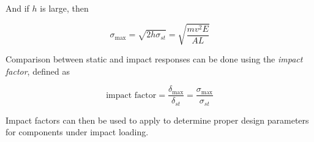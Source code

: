 \documentclass[
10pt,
a4paper,
openany,
svgnames,
]{book} %
\begin{document}
And if $h$ is large, then

\begin{equation}
  \sigma_{\max} = \sqrt{ 2h \sigma_{st} } = \sqrt{ \frac{mv^2 E}{AL} }
\end{equation}

Comparison between static and impact responses can be done using the \emph{impact factor}, defined as

\begin{equation}
  \text{impact factor} = \frac{\delta_{\max}}{\delta_{st}} = \frac{\sigma_{\max}}{\sigma_{st}}
\end{equation}

Impact factors can then be used to apply to determine proper design parameters for components under impact loading.

  
  
  

\end{document}
